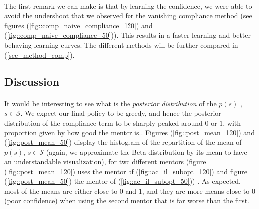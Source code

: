 \documentclass[a4paper]{report}
\begin{document}
{{{{			\paragraph{} The first remark we can make is that by learning the confidence, we were able  to avoid the undershoot that we observed for the vanishing compliance method (see figures (\ref{fig::comp_naive_compliance_120}) and (\ref{fig::comp_naive_compliance_50})). This results in a faster learning and better behaving learning curves. The different methods will be further compared in (\ref{sec_method_comp}). 
			}
			\subsection{Discussion}
			{
				\paragraph{} It would be interesting to see what is the \emph{posterior distribution} of the $p(s)$ , $s\in\mathcal{S}$. We expect our final policy to be greedy, and hence the posterior distribution of the compliance term to be sharply peaked around $0$ or $1$, with proportion given by how good the mentor is.. Figures (\ref{fig::post_mean_120}) and (\ref{fig::post_mean_50}) display the histogram of the repartition of the mean of $p(s)$, $s\in\mathcal{S}$ (again, we approximate the Beta distribution by its mean to have an understandable visualization), for two different mentors (figure (\ref{fig::post_mean_120}) uses the mentor of (\ref{fig::ac_il_subopt_120}) and figure (\ref{fig::post_mean_50}) the mentor of (\ref{fig::ac_il_subopt_50})) . As expected, most of the means are either close to $0$ and $1$, and they are more means close to 0 (poor confidence) when using the second mentor that is far worse than the first. 
				
}}}}
\end{document}
